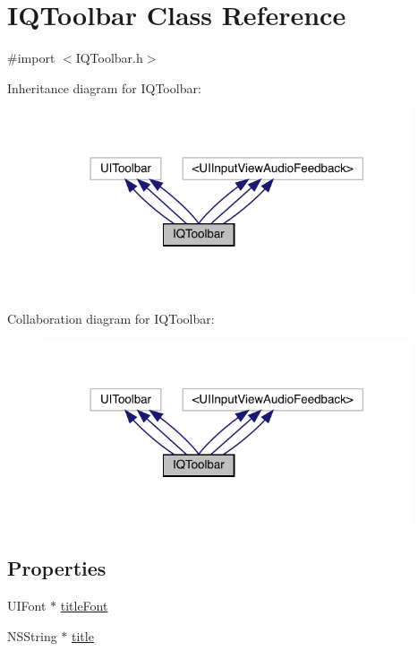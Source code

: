 \hypertarget{interface_i_q_toolbar}{}\section{I\+Q\+Toolbar Class Reference}
\label{interface_i_q_toolbar}


{\ttfamily \#import $<$I\+Q\+Toolbar.\+h$>$}



Inheritance diagram for I\+Q\+Toolbar\+:\nopagebreak
\begin{figure}[H]
\begin{center}
\leavevmode
\includegraphics[width=308pt]{interface_i_q_toolbar__inherit__graph}
\end{center}
\end{figure}


Collaboration diagram for I\+Q\+Toolbar\+:\nopagebreak
\begin{figure}[H]
\begin{center}
\leavevmode
\includegraphics[width=308pt]{interface_i_q_toolbar__coll__graph}
\end{center}
\end{figure}
\subsection*{Properties}
\begin{DoxyCompactItemize}
\item 
U\+I\+Font $\ast$ \mbox{\hyperlink{interface_i_q_toolbar_a3148b64e99599e69ef16077edb0b324e}{title\+Font}}
\item 
N\+S\+String $\ast$ \mbox{\hyperlink{interface_i_q_toolbar_aa7ef3850b96bedcda9fdab814a25c218}{title}}
\end{DoxyCompactItemize}


